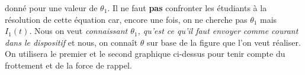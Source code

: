 donné pour une valeur de $\theta_1$. Il ne faut \textbf{pas} confronter les étudiants à la résolution de cette
équation car, encore une fois, on ne cherche pas $\theta_1$ mais $I_1(t)$. Nous on veut \textit{connaissant 
$\theta_1$, qu'est ce qu'il faut envoyer comme courant dans le dispositif} et nous, on connaît $\theta$ sur 
base de la figure que l'on veut réaliser. On utilisera le premier et le second graphique ci-dessus pour tenir
compte du frottement et de la force de rappel.































